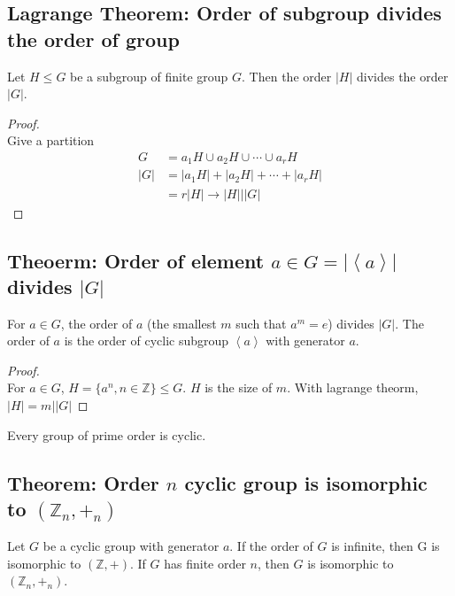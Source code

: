 \documentclass[11pt]{elegantbook}
\begin{document}
\subsection{Lagrange Theorem: Order of subgroup divides the order of group}
\begin{theorem}
    Let $H\leq G$ be a subgroup of finite group $G$. Then the order $|H|$ divides the order $|G|$.
\end{theorem}
\begin{proof}
\quad\\
Give a partition
\begin{equation}
    \begin{aligned}
        G&=a_1H\cup a_2H\cup \cdots \cup a_rH\\
        |G|&=|a_1H|+ |a_2H|+ \cdots + |a_rH|\\
        &=r|H|\rightarrow |H|\bigg||G|
    \end{aligned}
    \nonumber
\end{equation}
\end{proof}

\subsection{Theoerm: Order of element $a\in G =|\left\langle a\right\rangle|$ divides $|G|$}
\begin{theorem}
For $a\in G$, the order of $a$ (the smallest $m$ such that $a^m=e$) divides $|G|$. The order of $a$ is the order of cyclic subgroup $\left\langle a\right\rangle$ with generator $a$.
\end{theorem}

\begin{proof}
\quad\\
For $a\in G$, $H=\{a^n,n\in \mathbb{Z}\}\leq G$. $H$ is the size of $m$. With lagrange theorm, $|H|=m\bigg||G|$
\end{proof}

\begin{corollary}
Every group of prime order is cyclic.
\end{corollary}

\subsection{Theorem: Order $n$ cyclic group is isomorphic to $(\mathbb{Z}_n,+_n)$}
\begin{theorem}
    Let $G$ be a cyclic group with generator $a$. If the order of $G$ is infinite, then G is isomorphic to $(\mathbb{Z},+)$. If $G$ has finite order $n$, then $G$ is isomorphic to $(\mathbb{Z}_n,+_n)$.
\end{theorem}
\end{document}
